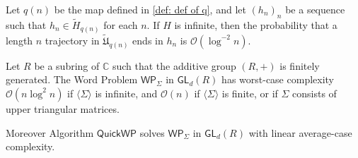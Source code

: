 \documentclass[10pt,a4paper]{amsart}
\def\C{\mathbb{C}}
\def\GL{\textsf{GL}}
\def\O{\mathcal{O}}
\def\S{\textsf{QuickWP}}
\def\WP{\textsf{WP}}
\def\tH{\tilde{H}}
\def\tU{\tilde{\mathfrak{U}}}
\begin{document}
\begin{corollary}\label{cor:convergence uniform lazy}
%
Let $q(n)$ be the map defined in \cref{def: def of q}, and let $(h_n)_n$ be a sequence such that $h_n \in \tH_{q(n)}$ for each $n$. 
%
If $H$ is infinite, then the probability that a length $n$ trajectory in $\tU_{q(n)}$ ends in $h_n$ is $\O(\log^{-2}n)$.
%
\end{corollary}

\begin{theorem}\label{thm: main for integer rings}
    Let $R$ be a subring of $\C$ such that the additive group $(R,+)$ is finitely generated. The Word Problem $\WP_\Sigma$ in $\GL_d(R)$ has worst-case complexity $\O(n\log^2n)$ if $\langle\Sigma\rangle$ is infinite, and $\O(n)$ if $\langle\Sigma\rangle$ is finite, or if $\Sigma$ consists of upper triangular matrices.
    
    Moreover Algorithm $\S$ solves $\WP_\Sigma$ in $\GL_d(R)$ with linear average-case complexity.
\end{theorem}
\end{document}

